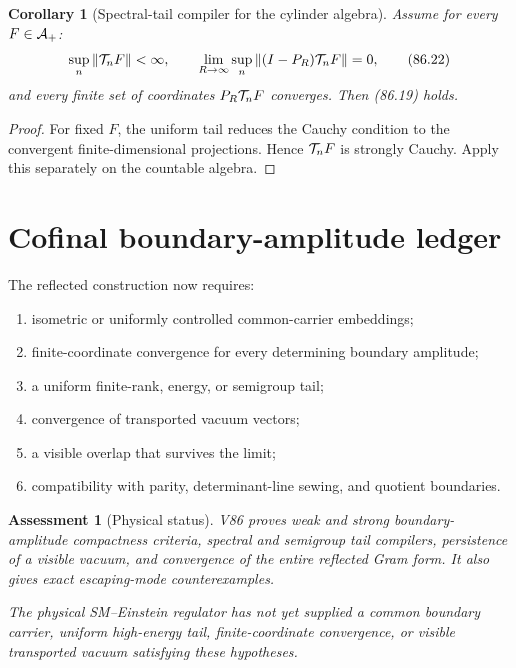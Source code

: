 \documentclass[11pt]{article}
\newtheorem{corollary}[theorem]{Corollary}
\newtheorem{assessment}[theorem]{Assessment}
\theoremstyle{remark}
\begin{document}
\begin{corollary}[Spectral-tail compiler for the cylinder algebra]
\label{cor:v15v86-algebra-tail}
Assume for every \(F\in{\cal A}_+\):
\[
 \sup_n\|{\cal T}_nF\|<\infty,\qquad
 \lim_{R\to\infty}\sup_n
 \|(I-P_R){\cal T}_nF\|=0,                            \tag{86.22}
\]
and every finite set of coordinates
\(P_R{\cal T}_nF\) converges.  Then (86.19) holds.
\end{corollary}

\begin{proof}
For fixed \(F\), the uniform tail reduces the Cauchy condition to
the convergent finite-dimensional projections.  Hence
\({\cal T}_nF\) is strongly Cauchy.  Apply this separately on the
countable algebra.
\end{proof}

\section{Cofinal boundary-amplitude ledger}

The reflected construction now requires:
\begin{enumerate}
\item isometric or uniformly controlled common-carrier embeddings;
\item finite-coordinate convergence for every determining
      boundary amplitude;
\item a uniform finite-rank, energy, or semigroup tail;
\item convergence of transported vacuum vectors;
\item a visible overlap that survives the limit;
\item compatibility with parity, determinant-line sewing, and
      quotient boundaries.
\end{enumerate}

\begin{assessment}[Physical status]
\label{ass:v15v86-status}
V86 proves weak and strong boundary-amplitude compactness criteria,
spectral and semigroup tail compilers, persistence of a visible
vacuum, and convergence of the entire reflected Gram form.  It
also gives exact escaping-mode counterexamples.

The physical SM--Einstein regulator has not yet supplied a common
boundary carrier, uniform high-energy tail, finite-coordinate
convergence, or visible transported vacuum satisfying these
hypotheses.
\end{assessment}
\end{document}
